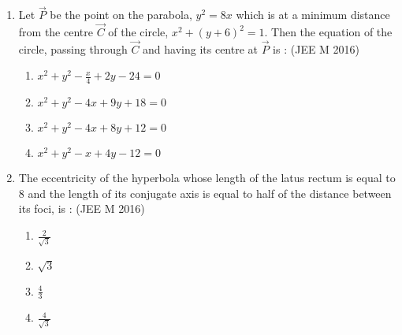 \documentclass[journal,12pt,twocolumn]{IEEEtran}
\theoremstyle{remark}
\begin{document}
\begin{enumerate}
    \item Let $\vec{P}$ be the point on the parabola, $y^2=8x$ which is at a minimum distance from the centre $\vec{C}$ of the circle, $x^2+(y+6)^2=1$. Then the equation of the circle, passing through $\vec{C}$ and having its centre at $\vec{P}$ is :
    \hfill(JEE M 2016)
    \begin{enumerate}[label=(\alph*)]
    \item $x^2+y^2-\frac{x}{4}+2y-24=0$
    \item $x^2+y^2-4x+9y+18=0$
    \item $x^2+y^2-4x+8y+12=0$
    \item $x^2+y^2-x+4y-12=0$\\
    \end{enumerate}
    
    \item The eccentricity of the hyperbola whose length of the latus rectum is equal to $8$ and the length of its conjugate axis is equal to half of the distance between its foci, is :
    \hfill(JEE M 2016)
    \begin{enumerate}[label=(\alph*)]
    \item$\frac{2}{\sqrt{3}}$
    \item$\sqrt{3}$
    \item$\frac{4}{3}$
    \item$\frac{4}{\sqrt{3}}$ \\
    \end{enumerate}

\end{enumerate}
\end{document}
